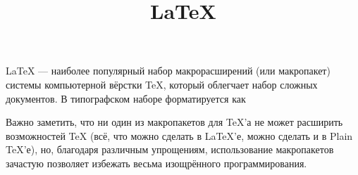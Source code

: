\documentclass[12pt]{article}
\title{\LaTeX}
\date{}
\author{}
\begin{document}
LaTeX — наиболее
 популярный набор макрорасширений (или макропакет) системы компьютерной вёрстки TeX, который 
 облегчает набор сложных документов. В типографском наборе форматируется как 

Важно заметить, что ни один из макропакетов для TeX’а не может расширить возможностей TeX 
(всё, что можно сделать в LaTeX’е, можно сделать и в Plain TeX’е), но, благодаря различным 
упрощениям, использование макропакетов зачастую позволяет избежать весьма изощрённого 
программирования.
  
\end{document}
